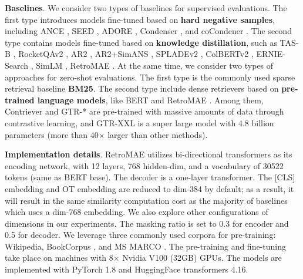 \documentclass[11pt,a4paper]{article}
\begin{document}
\textbf{Baselines}. We consider two types of baselines for supervised evaluations. The first type introduces models fine-tuned based on \textbf{hard negative samples}, including ANCE \cite{xiong2020approximate}, SEED \cite{lu2021less}, ADORE \cite{zhan2021optimizing}, Condenser \cite{gao2021condenser}, and coCondener \cite{gao2021unsupervised}. The second type contains models fine-tuned based on \textbf{knowledge distillation}, such as TAS-B \cite{hofstatter2021efficiently}, RocketQAv2 \cite{ren2021rocketqav2}, AR2 \cite{zhang2021adversarial}, AR2+SimANS \cite{zhou2022simans}, SPLADEv2 \cite{formal2021splade}, ColBERTv2 \cite{santhanam2021colbertv2}, ERNIE-Search \cite{lu2022ernie}, SimLM \cite{wang2022simlm}, RetroMAE \cite{liu2022retromae}. At the same time, we consider two types of approaches for zero-shot evaluations. The first type is the commonly used sparse retrieval baseline \textbf{BM25}. The second type include dense retrievers based on \textbf{pre-trained language models}, like BERT \cite{Devlin2019BERT} and RetroMAE \cite{liu2022retromae}. Among them, Contriever \cite{izacard2021towards} and GTR-* \cite{ni2021large} are pre-trained with massive amounts of data through contrastive learning, and GTR-XXL is a super large model with 4.8 billion parameters (more than 40$\times$ larger than other methods). 




\textbf{Implementation details}. RetroMAE utilizes bi-directional transformers as its encoding network, with 12 layers, 768 hidden-dim, and a vocabulary of 30522 tokens (same as BERT base). The decoder is a one-layer transformer. The [CLS] embedding and OT embedding are reduced to dim-384 by default; as a result, it will result in the same similarity computation cost as the majority of baselines which uses a dim-768 embedding. We also explore other configurations of dimensions in our experiments. The masking ratio is set to 0.3 for encoder and 0.5 for decoder. We leverage three commonly used corpora for pre-training: Wikipedia, BookCorpus \cite{Devlin2019BERT}, and MS MARCO \cite{nguyen2016ms}. The pre-training and fine-tuning take place on machines with 8$\times$ Nvidia V100 (32GB) GPUs. The models are implemented with PyTorch 1.8 and HuggingFace transformers 4.16. 
\end{document}
